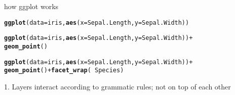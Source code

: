 \documentclass[10pt]{beamer}\usepackage[]{graphicx}\usepackage[]{color}
\makeatletter
\newcommand{\hlopt}[1]{\textcolor[rgb]{0,0,0}{#1}}%
\newcommand{\hlstd}[1]{\textcolor[rgb]{0.345,0.345,0.345}{#1}}%
\newcommand{\hlkwc}[1]{\textcolor[rgb]{0.333,0.667,0.333}{#1}}%
\newcommand{\hlkwd}[1]{\textcolor[rgb]{0.737,0.353,0.396}{\textbf{#1}}}%
\newenvironment{kframe}{%
 \def\at@end@of@kframe{}%
 \ifinner\ifhmode%
  \def\at@end@of@kframe{\end{minipage}}%
  \begin{minipage}{\columnwidth}%
 \fi\fi%
 \def\FrameCommand##1{\hskip\@totalleftmargin \hskip-\fboxsep
 \colorbox{shadecolor}{##1}\hskip-\fboxsep
     \hskip-\linewidth \hskip-\@totalleftmargin \hskip\columnwidth}%
 \MakeFramed {\advance\hsize-\width
   \@totalleftmargin\z@ \linewidth\hsize
   \@setminipage}}%
 {\par\unskip\endMakeFramed%
 \at@end@of@kframe}
\newenvironment{knitrout}{}{} %
\makeatother
\begin{document}
\begin{frame}[fragile]{how ggplot works}

\begin{knitrout}
\color{fgcolor}\begin{kframe}
\begin{alltt}
\hlkwd{ggplot}\hlstd{(}\hlkwc{data}\hlstd{=iris,} \hlkwd{aes}\hlstd{(}\hlkwc{x}\hlstd{=Sepal.Length,} \hlkwc{y}\hlstd{=Sepal.Width))}
\end{alltt}
\end{kframe}
\end{knitrout}
\pause

\begin{knitrout}
\color{fgcolor}\begin{kframe}
\begin{alltt}
\hlkwd{ggplot}\hlstd{(}\hlkwc{data}\hlstd{=iris,} \hlkwd{aes}\hlstd{(}\hlkwc{x}\hlstd{=Sepal.Length,} \hlkwc{y}\hlstd{=Sepal.Width))} \hlopt{+}
  \hlkwd{geom_point}\hlstd{()}
\end{alltt}
\end{kframe}
\end{knitrout}
\pause
\begin{knitrout}
\color{fgcolor}\begin{kframe}
\begin{alltt}
\hlkwd{ggplot}\hlstd{(}\hlkwc{data}\hlstd{=iris,} \hlkwd{aes}\hlstd{(}\hlkwc{x}\hlstd{=Sepal.Length,} \hlkwc{y}\hlstd{=Sepal.Width))} \hlopt{+}
  \hlkwd{geom_point}\hlstd{()} \hlopt{+} \hlkwd{facet_wrap}\hlstd{(}\hlopt{~}\hlstd{Species)}
\end{alltt}
\end{kframe}
\end{knitrout}

\alert{\Large 1. Layers interact according to grammatic rules; not on top of each other}
\end{frame}
\end{document}
